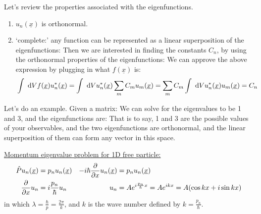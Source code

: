 \documentclass{school-22.101-notes}
\begin{document}
Let's review the properties associated with the eigenfunctions. 
\begin{enumerate}
\item $u_n(\underline{x})$ is orthonormal. 


\item `complete:' any function can be represented as a linear superposition of the eigenfunctions:
Then we are interested in finding the constants $C_n$, by using the orthonormal properties of the eigenfunctions:
We can approve the above expression by plugging in what $f(\underline{x})$ is:
\begin{align}
& \int \mbox{ }\mathrm{d} V f(\underline{x}) u_n^* (\underline{x}) = \int \mbox{ }\mathrm{d} V  u_n^* (\underline{x}) \displaystyle\sum_m C_m u_m(\underline{x}) = \displaystyle\sum_m C_m \int \mbox{ }\mathrm{d} V u_n^*(\underline{x}) u_m (\underline{x}) = C_n
\end{align}

\end{enumerate}

Let's do an example. Given a matrix:
We can solve for the eigenvalues to be 1 and 3, and the eigenfunctions are:
That is to say, 1 and 3 are the possible values of your observables, and the two eigenfunctions are orthonormal, and the linear superposition of them can form any vector in this space.


\uline{Momentum eigenvalue problem for 1D free particle: }
\begin{align}
\hat{P} u_n(\underline{x}) &= p_n u_n(\underline{x}) & -i\hbar \frac{\partial}{\partial x} u_n(\underline{x}) &= p_n u_n(\underline{x}) \\
\frac{\partial}{\partial x} u_n &= i \frac{p_n}{\hbar} u_n   & u_n &= A e^{i \frac{p_n}{\hbar} x} = A e^{ikx} = A (\cos kx + i \sin kx) 
\end{align}
in which $\lambda = \frac{\hbar}{p} = \frac{2\pi}{k}$, and $k$ is the wave number defined by $k = \frac{p_n}{\hbar}$.
\end{document}
